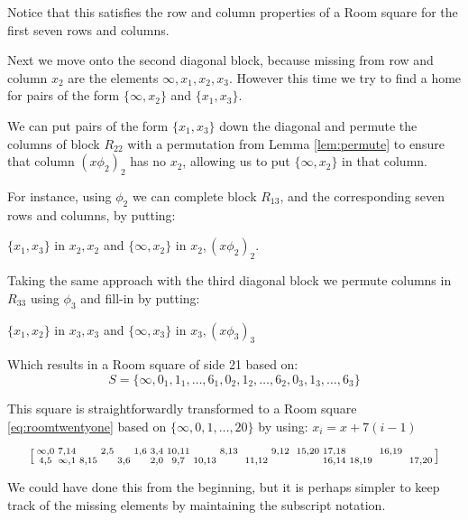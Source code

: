 \begin{example}
Notice that this satisfies the row and column properties of a Room square for the first seven rows and columns.

Next we move onto the second diagonal block, because missing from row and column $x_2$ are the elements $\infty, x_1, x_2, x_3$.
However this time we try to find a home for pairs of the form $\{\infty, x_2\}$ and $\{x_1, x_3\}$.

We can put pairs of the form $\{x_1, x_3\}$ down the diagonal and permute the columns of block $R_{22}$ with a permutation from Lemma \ref{lem:permute} to ensure that column $(x\phi _2)_2$ has no $x_2$, allowing us to put $\{\infty, x_2\}$ in that column.

For instance, using $\phi _2$ we can complete block $R_{13}$, and the corresponding seven rows and columns, by putting:

$\{x_1, x_3\}$ in $x_2, x_2$ and $\{\infty, x_2\}$ in $x_2,(x \phi _2)_2$.

Taking the same approach with the third diagonal block we permute columns in $R_{33}$ using $\phi _3$ and fill-in by putting:

$\{x_1, x_2\}$ in $x_3, x_3$ and $\{\infty, x_3\}$ in $x_3, (x \phi _3)_3$

Which results in a Room square of side 21 based on:
$$S = \{\infty, 0_1, 1_1, \ldots, 6_1, 0_2, 1_2, \ldots, 6_2, 0_3, 1_3, \ldots, 6_3\}$$

This square is straightforwardly transformed to a Room square
\eqref{eq:roomtwentyone}
based on $\{\infty, 0, 1, \ldots, 20\}$ by using: $x_i = x + 7(i - 1)$

\begin{equation}
  \label{eq:roomtwentyone}
  \begin{bsmallmatrix}
    \infty,0 &   7,14   &      & 2,5 &     & 1,6 & 3,4 & 10,11 &       & 8,13 & &       & 9,12 & & 15,20 & 17,18 &       & & 16,19 & &       \\
      4,5    & \infty,1 & 8,15 &     & 3,6 &     & 2,0 &  9,7  & 10,13 &      & & 11,12 &      & &       & 16,14 & 18,19 & &       & & 17,20 \\
  \end{bsmallmatrix}
\end{equation}

We could have done this from the beginning, but it is perhaps simpler to keep track of the missing elements by maintaining the subscript notation.
\end{example}

